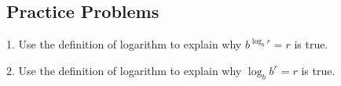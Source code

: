 \documentclass[10pt,]{book}
\theoremstyle{plain}
\theoremstyle{definition}
\theoremstyle{definition}
\theoremstyle{definition}
\numberwithin{equation}{section}
\begin{document}
\subsection[{Practice Problems}]{Practice Problems}\label{exercises-11}
\begin{exerciselist}
\item[1.]\hypertarget{exercise-73}{}\hypertarget{p-297}{}%
Use the definition of logarithm to explain why \(b^{\log_b r} = r\) is true.%
\par\smallskip
\item[2.]\hypertarget{exercise-74}{}\hypertarget{p-298}{}%
Use the definition of logarithm to explain why \(\log_b b^r = r\) is true.%
\par\smallskip
\end{exerciselist}
\typeout{************************************************}
\typeout{************************************************}
\end{document}
